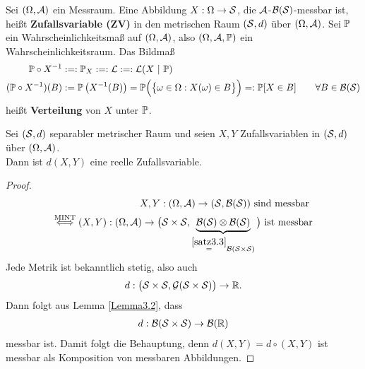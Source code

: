 \begin{definition} %
Sei $(\Omega,\A)$ ein Messraum. Eine Abbildung
$X:\Omega\to\S$, die $\A$-$\B(\S)$-messbar ist, heißt \textbf{Zufallsvariable (ZV)} in den metrischen Raum $(\S,d)$ über $(\Omega,\A)$.\nl
Sei $\P$ ein Wahrscheinlichkeitsmaß auf $(\Omega,\A)$, also $(\Omega,\A,\P)$ ein Wahrscheinlichkeitsraum. Das Bildmaß
\begin{align*}
\P\circ X^{-1}&:=:\P_X:=:\mathcal{L}:=:\mathcal{L}(X~|~\P)\\
(\P\circ X^{-1})(B)&:=\P\left(X^{-1}(B)\right)=\P\Big(\big\lbrace\omega\in\Omega:X(\omega)\in B\big\rbrace\Big)
=: \P[X\in B]
\qquad\forall B\in\B(\S)
\end{align*}
heißt \textbf{Verteilung} von $X$ unter $\P$.
\end{definition}

\begin{satz}\label{Satz3.5} %
Sei $(\S,d)$ separabler metrischer Raum und seien $X,Y$ Zufallsvariablen in $(\S,d)$ über $(\Omega,\A)$.\\
Dann ist $d(X,Y)$ eine reelle Zufallsvariable.
\end{satz}

\begin{proof}
\begin{align*}
X,Y:(\Omega,\A)\to(\S,\B(\S))\text{ sind messbar }\\
\stackrel{\text{MINT}}{\Longleftrightarrow}
(X,Y):(\Omega,\A)\to\big(\S\times\S,\underbrace{\B(\S)\otimes\B(\S)}_{\stackeq{\ref{satz3.3}}\B(\S\times\S)}\big)\text{ ist messbar}\\
\end{align*}
Jede Metrik ist bekanntlich stetig, also auch
\begin{align*}
d:\big(\S\times\S,\G(\S\times\S)\big)\to\R.
\end{align*}
Dann folgt aus Lemma \ref{Lemma3.2}, dass
\begin{align*}
d:\B(\S\times\S)\to\B(\R)
\end{align*}
messbar ist. Damit folgt die Behauptung, denn $d(X,Y)=d\circ(X,Y)$ ist messbar als Komposition von messbaren Abbildungen.
\end{proof}

